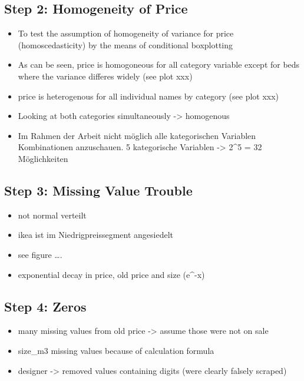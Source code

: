\documentclass[a4paper, nobind]{templates/ociamthesis}
\providecommand{\tightlist}{%
  \setlength{\itemsep}{0pt}\setlength{\parskip}{0pt}}
\begin{document}
\hypertarget{step-2-homogeneity-of-price}{%
\subsection{Step 2: Homogeneity of Price}\label{step-2-homogeneity-of-price}}

\begin{itemize}
\tightlist
\item
  To test the assumption of homogeneity of variance for price (homoscedasticity) by the means of conditional boxplotting
\item
  As can be seen, price is homogoneous for all category variable except for beds where the variance differes widely (see plot xxx)
\item
  price is heterogenous for all individual names by category (see plot xxx)
\item
  Looking at both categories simultaneously -\textgreater{} homogenous
\item
  Im Rahmen der Arbeit nicht möglich alle kategorischen Variablen Kombinationen anzuschauen. 5 kategorische Variablen -\textgreater{} 2\^{}5 = 32 Möglichkeiten
\end{itemize}

\hypertarget{step-3-missing-value-trouble}{%
\subsection{Step 3: Missing Value Trouble}\label{step-3-missing-value-trouble}}

\begin{itemize}
\tightlist
\item
  not normal verteilt
\item
  ikea ist im Niedrigpreissegment angesiedelt
\item
  see figure \ldots{}.
\item
  exponential decay in price, old price and size (e\^{}-x)
\end{itemize}

\hypertarget{zeros}{%
\subsection{Step 4: Zeros}\label{zeros}}

\begin{itemize}
\tightlist
\item
  many missing values from old price -\textgreater{} assume those were not on sale
\item
  size\_m3 missing values because of calculation formula
\item
  designer -\textgreater{} removed values containing digits (were clearly falsely scraped)
\end{itemize}
\end{document}
